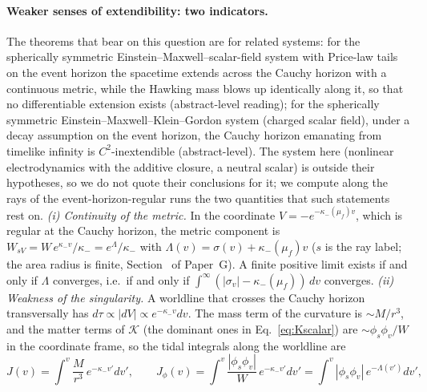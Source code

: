 \documentclass[11pt]{article}
\begin{document}
\paragraph{Weaker senses of extendibility: two indicators.} The theorems that bear on this question are for related systems: for the spherically symmetric Einstein--Maxwell--scalar-field system with Price-law tails on the event horizon the spacetime extends across the Cauchy horizon with a continuous metric, while the Hawking mass blows up identically along it, so that no differentiable extension exists \citep{Dafermos2005} (abstract-level reading); for the spherically symmetric Einstein--Maxwell--Klein--Gordon system (charged scalar field), under a decay assumption on the event horizon, the Cauchy horizon emanating from timelike infinity is $C^2$-inextendible \citep{VanDeMoortel2020} (abstract-level). The system here (nonlinear electrodynamics with the additive closure, a neutral scalar) is outside their hypotheses, so we do not quote their conclusions for it; we compute along the rays of the event-horizon-regular runs the two quantities that such statements rest on. \emph{(i) Continuity of the metric.} In the coordinate $V=-e^{-\kappa_-(\mu_f)v}$, which is regular at the Cauchy horizon, the metric component is $W_{sV}=W\,e^{\kappa_-v}/\kappa_-=e^{\Lambda}/\kappa_-$ with $\Lambda(v)=\sigma(v)+\kappa_-(\mu_f)v$ ($s$ is the ray label; the area radius is finite, Section~\Grayn{} of Paper~G). A finite positive limit exists if and only if $\Lambda$ converges, i.e.\ if and only if $\int^\infty(|\sigma_v|-\kappa_-(\mu_f))\,dv$ converges. \emph{(ii) Weakness of the singularity.} A worldline that crosses the Cauchy horizon transversally has $d\tau\propto|dV|\propto e^{-\kappa_-v}dv$. The mass term of the curvature is $\sim M/r^3$, and the matter terms of $\mathcal K$ (the dominant ones in Eq.~\eqref{eq:Kscalar}) are $\sim\phi_s\phi_v/W$ in the coordinate frame, so the tidal integrals along the worldline are
\begin{equation}
J(v)=\int^{v}\frac{M}{r^{3}}\,e^{-\kappa_-v'}dv',\qquad J_\phi(v)=\int^{v}\frac{|\phi_s\phi_v|}{W}\,e^{-\kappa_-v'}dv'=\int^{v}|\phi_s\phi_v|\,e^{-\Lambda(v')}dv',
\label{eq:tidal}
\end{equation}
\end{document}
